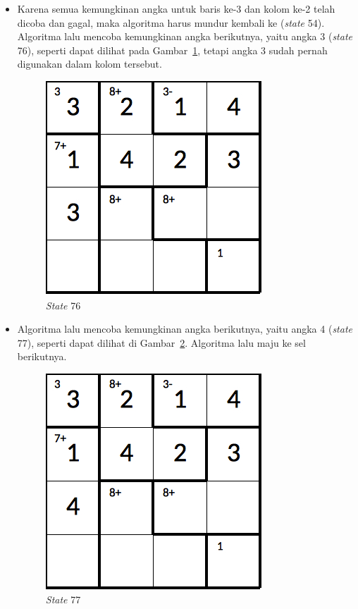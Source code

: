 \documentclass[a4paper,twoside]{article}
\begin{document}
\begin{enumerate}
\begin{itemize}
\item Karena semua kemungkinan angka untuk baris ke-3 dan kolom ke-2 telah dicoba dan gagal, maka algoritma harus mundur kembali ke (\textit{state} 54). Algoritma lalu mencoba kemungkinan angka berikutnya, yaitu angka 3 (\textit{state} 76), seperti dapat dilihat pada Gambar~\ref{fig:analisisbt24}, tetapi angka 3 sudah pernah digunakan dalam kolom tersebut.

\begin{figure}
\centering
\captionsetup{justification=centering}
\includegraphics[scale=0.333]{Gambar/backtracking/State76}
\caption[\textit{State} 76]{\textit{State} 76}
\label{fig:analisisbt24}
\end{figure}

\item Algoritma lalu mencoba kemungkinan angka berikutnya, yaitu angka 4 (\textit{state} 77), seperti dapat dilihat di Gambar~\ref{fig:analisisbt25}. Algoritma lalu maju ke sel berikutnya.

\begin{figure}
\centering
\captionsetup{justification=centering}
\includegraphics[scale=0.333]{Gambar/backtracking/State77}
\caption[\textit{State} 77]{\textit{State} 77}
\label{fig:analisisbt25}
\end{figure}


\end{itemize}
\end{enumerate}
\end{document}
